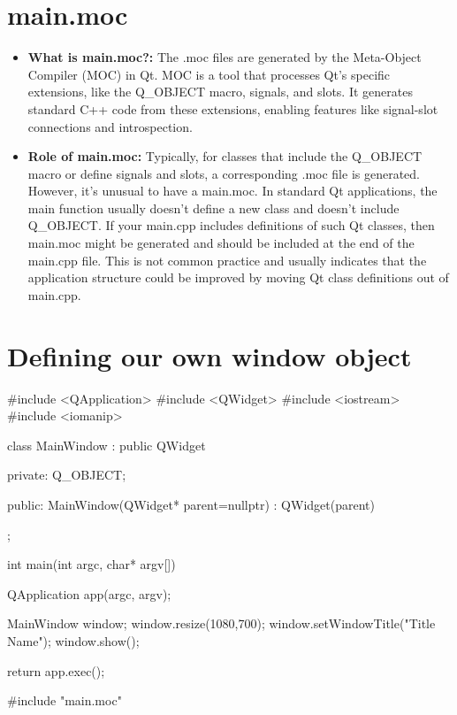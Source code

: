 \documentclass{report}
\begin{document}
    \pagebreak 
    \section*{main.moc}
    \bigbreak \noindent 
    \begin{itemize}
        \item \textbf{What is main.moc?:} The .moc files are generated by the Meta-Object Compiler (MOC) in Qt. MOC is a tool that processes Qt's specific extensions, like the Q\_OBJECT macro, signals, and slots. It generates standard C++ code from these extensions, enabling features like signal-slot connections and introspection.
        \item \textbf{Role of main.moc:} Typically, for classes that include the Q\_OBJECT macro or define signals and slots, a corresponding .moc file is generated. However, it's unusual to have a main.moc. In standard Qt applications, the main function usually doesn't define a new class and doesn't include Q\_OBJECT. If your main.cpp includes definitions of such Qt classes, then main.moc might be generated and should be included at the end of the main.cpp file. This is not common practice and usually indicates that the application structure could be improved by moving Qt class definitions out of main.cpp.
    \end{itemize}

    \bigbreak \noindent 
    \section*{Defining our own window object}
    \bigbreak \noindent 
    \begin{cppcode}
#include <QApplication>
#include <QWidget>
#include <iostream>
#include <iomanip>

class MainWindow : public QWidget {
private:
    Q_OBJECT;

public:
    MainWindow(QWidget* parent=nullptr) : QWidget(parent) {

    }

};

int main(int argc, char* argv[]) {
    QApplication app(argc, argv);

    MainWindow window;
    window.resize(1080,700);
    window.setWindowTitle("Title Name");
    window.show();

    return app.exec();
}
#include "main.moc"
    \end{cppcode}
\end{document}
